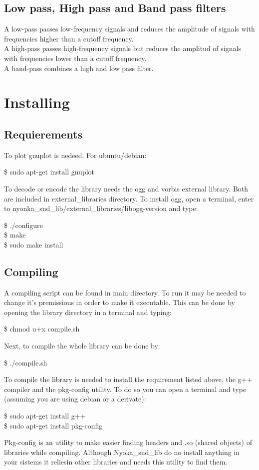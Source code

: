 \documentclass[letterpaper]{article}
\begin{document}
\subsection{Low pass, High pass and Band pass filters}
A low-pass passes low-frequency signals and reduces the amplitude of signals with frequencies higher than a cutoff frequency.\\
A high-pass passes high-frequency signals but reduces the amplitud of signals with frequencies lower than a cutoff frequency.\\
A band-pass combines a high and low pass filter. 

\section{Installing}
\subsection{Requierements}
To plot gnuplot is nedeed. For ubuntu/debian:
\begin{center}
\$ sudo apt-get install gnuplot\\
\end{center}
To decode or encode the library needs the ogg and vorbis external library. Both are included in external\_libraries directory. To install ogg, open a terminal, enter to nyonka\_snd\_lib/external\_libraries/libogg-version and type:
\begin{center}
	\$ ./configure\\
	\$ make\\
	\$ sudo make install
\end{center}
\subsection{Compiling}
A compiling script can be found in main directory. To run it may be needed to change it's premissions in order to make it executable. This can be done by opening the library directory in a terminal and typing:
\begin{center}
	\$ chmod u+x compile.sh
\end{center}
Next, to compile the whole library can be done by:
\begin{center}
	\$ ./compile.sh
\end{center}
To compile the library is needed to install the requirement listed above, the g++ compiler and the pkg-config utility. To do so you can open a terminal and type (assuming you are using debian or a derivate):
\begin{center}
	\$ sudo apt-get install g++\\
	\$ sudo apt-get install pkg-config	
\end{center}	
Pkg-config is an utility to make easier finding headers and .so (shared objects) of libraries while compiling. Although Nyoka\_snd\_lib do no install anything in your sistems it reliesin other libraries and needs this utility to find them. 
\end{document}
